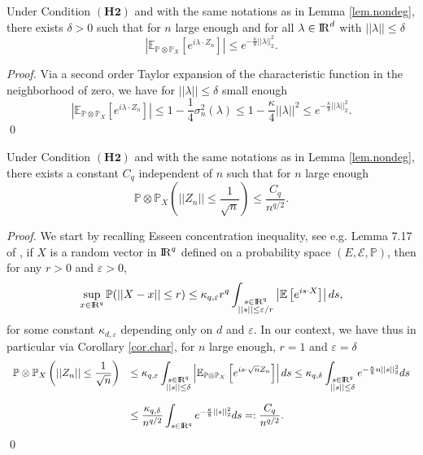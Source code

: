 \documentclass{svproc}
\newcommand{\Prob}{\mathbb{P}}
\newcommand \Esp {\mathbb{E}}
\def\R{{\rm I\kern-0.16em R}}
\begin{document}
\begin{corollary}\label{cor.char}
Under Condition $(\mathbf{H2})$ and with the same notations as in Lemma \ref{lem.nondeg}, there exists $\delta>0$ such that for $n$ large enough and for all $\lambda\in \R^d$ with $||\lambda||\leq \delta$
\[
\left|  \Esp_{\Prob\otimes \Prob_X}\left[ e^{i \lambda \cdot Z_n}\right] \right| \leq e^{-\frac{\kappa }{8}||\lambda||_2^2}.
\]
\end{corollary}

\begin{proof}
Via a second order Taylor expansion of the characteristic function in the neighborhood of zero, we have for $|| \lambda||\leq \delta$ small enough
\[
\left|  \Esp_{\Prob\otimes \Prob_X}\left[ e^{i \lambda \cdot Z_n}\right] \right| \leq 1- \frac{1}{4} \sigma_n^2(\lambda) \leq 1- \frac{\kappa}{4} ||\lambda||^2 \leq  e^{-\frac{\kappa }{8}||\lambda||_2^2}.
\]
\qed
\end{proof}


\begin{proposition}\label{pro.kolmorogo}
Under Condition $(\mathbf{H2})$ and with the same notations as in Lemma \ref{lem.nondeg}, there exists a constant $C_{q}$ independent of $n$ such that for $n$ large enough 
\[
\mathbb P \otimes \mathbb P_X\left(  ||Z_n||\leq \frac{1}{\sqrt{n}} \right) \leq \frac{C_q}{n^{q/2}}.
\]
\end{proposition}


\begin{proof}
We start by recalling Esseen concentration inequality, see e.g. Lemma 7.17 of \cite{MR2289012}, if $X$ is a random vector in $\R^q$ defined on a probability space $(E, \mathcal E, \mathbb P)$, then for any ${r>0}$ and $ {\varepsilon > 0}$, 
\[
\displaystyle \sup_{x \in {\R}^q} \mathbb P ( ||X - x|| \leq r ) \leq \kappa_{q,\varepsilon} r^q \int_{\substack{s \in {\R}^q\\ ||s|| \leq \varepsilon/r}}  \left|\mathbb E\left[  e^{i s \cdot X}\right]\right| ds,
\]
for some constant ${\kappa_{d,\varepsilon}}$ depending only on ${d}$ and ${\varepsilon}$.
In our context, we have thus in particular via Corollary \ref{cor.char}, for $n$ large enough, $r=1$ and $\varepsilon=\delta$ 
\[
\begin{array}{ll}
\displaystyle \mathbb P \otimes \mathbb P_X\left( || Z_n|| \leq \frac{1}{\sqrt{n}} \right)&  \displaystyle \leq \kappa_{q,\varepsilon}  \int_{\substack{s\in {\R}^q\\ ||s|| \leq \delta}}  \left|\Esp_{\Prob\otimes \Prob_X} \left[  e^{i s \cdot \sqrt{n} Z_n }\right]\right| ds \leq \kappa_{q,\delta}  \int_{\substack{s \in {\R}^q\\ ||s|| \leq \delta}}  e^{-\frac{\kappa }{8}n ||s||_2^2} ds\\
\\
& \leq\displaystyle \frac{\kappa_{q,\delta} }{n^{q/2}} \int_{s \in {\R}^q}  e^{-\frac{\kappa }{8}||s||_2^2} ds=: \frac{C_q}{n^{q/2}}.
\end{array}
\]
\qed
\end{proof}
\end{document}

